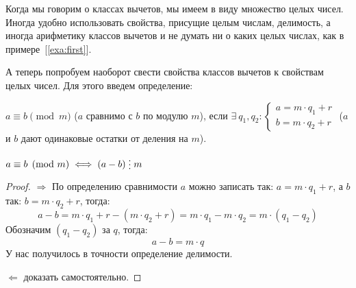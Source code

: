 \documentclass[russian]{lecture-notes}
\newcommand{\divs}{\mathrel{\raisebox{-2pt}{\vdots}}}
\begin{document}
\begin{note}
	Когда мы говорим о классах вычетов, мы имеем в виду множество целых чисел. Иногда удобно использовать свойства, присущие целым числам, делимость, а иногда арифметику классов вычетов и не думать ни о каких целых числах, как в примере~[\ref{exa:first}]. 
\end{note}

А теперь попробуем наоборот свести свойства классов вычетов к свойствам целых чисел. Для этого введем определение:
\begin{definition}
	$a \equiv b \pmod m$ ($a$ сравнимо с $b$ по модулю $m$), если $\exists \ q_1,q_2 : 
	\begin{cases}
		a = m \cdot q_1 + r \\
		b = m \cdot q_2 + r
	\end{cases}$
	($a$ и $b$ дают одинаковые остатки от деления на $m$). 
\end{definition}

\begin{theorem}
	$a \equiv b \pmod m \iff (a-b) \divs{m}$
\end{theorem}

\begin{proof}
	$\Rightarrow$ По определению сравнимости $a$ можно записать так: $a = m \cdot q_1 + r$, а $b$ так: $b = m \cdot q_2 + r$, тогда:
	\[
		a - b = m \cdot q_1 + r - (m \cdot q_2 + r) = m \cdot q_1 - m \cdot q_2 = m \cdot (q_1 - q_2) 
	\]
	Обозначим $(q_1 - q_2)$ за $q$, тогда:
	\[
		a - b = m \cdot q
	\]
	У нас получилось в точности определение делимости.
	
	\noindent$\Leftarrow$ доказать самостоятельно.
	
\end{proof}
\end{document}
